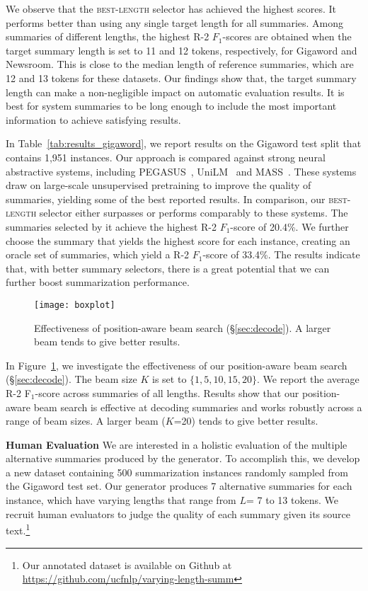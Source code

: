 \documentclass[11pt]{article}
\begin{document}
We observe that the \textsc{best-length} selector has achieved the highest scores.
It performs better than using any single target length for all summaries.
Among summaries of different lengths, the highest R-2 $F_1$-scores are obtained when the target summary length is set to 11 and 12 tokens, respectively, for Gigaword and Newsroom.
This is close to the median length of reference summaries, which are 12 and 13 tokens for these datasets.
Our findings show that, 
the target summary length can make a non-negligible impact on automatic evaluation results.
It is best for system summaries to be long enough to include the most important information to achieve satisfying results.


In Table~\ref{tab:results_gigaword}, we report results on the Gigaword test split that contains 1,951 instances.
Our approach is compared against strong neural abstractive systems, including PEGASUS~\cite{zhang2020pegasus}, UniLM~\cite{NIPS2019_9464} and MASS~\cite{song2019mass}.
These systems draw on large-scale unsupervised pretraining to improve the quality of summaries, yielding some of the best reported results.
In comparison, our \textsc{best-length} selector either surpasses or performs comparably to these systems. 
The summaries selected by it achieve the highest R-2 $F_1$-score of 20.4\%.
We further choose the summary that yields the highest score for each instance, creating an oracle set of summaries, which yield a R-2 $F_1$-score of 33.4\%.
The results indicate that, with better summary selectors, there is a great potential that we can further boost summarization performance.


\begin{figure}[t]
\centering
\texttt{[image: boxplot]}
\vspace{-0.05in}
\caption{Effectiveness of position-aware beam search (\S\ref{sec:decode}). 
A larger beam tends to give better results.}
\label{fig:beam}
\vspace{-0.15in}
\end{figure}


In Figure~\ref{fig:beam}, we investigate the effectiveness of our position-aware beam search (\S\ref{sec:decode}).
The beam size $K$ is set to $\{1, 5, 10, 15, 20\}$.
We report the average R-2 F$_1$-score across summaries of all lengths.
Results show that our position-aware beam search is effective at decoding summaries and works robustly across a range of beam sizes. 
A larger beam ($K$=20) tends to give better results.


\vspace{0.08in}
\noindent\textbf{Human Evaluation}\quad
We are interested in a holistic evaluation of the multiple alternative summaries produced by the generator.
To accomplish this, we develop a new dataset containing 500 summarization instances randomly sampled from the Gigaword test set.
Our generator produces 7 alternative summaries for each instance, which have varying lengths that range from $L$= 7 to 13 tokens.
We recruit human evaluators to judge the quality of each summary given its source text.\footnote{Our annotated dataset is available on Github at \url{https://github.com/ucfnlp/varying-length-summ}}
\end{document}
